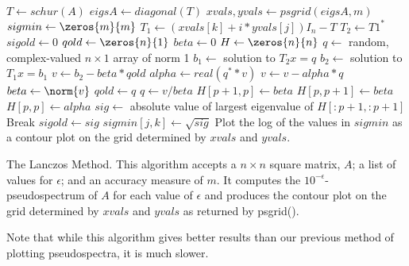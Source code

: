 \begin{algorithm}
\begin{algorithmic}[1]
	\State $T \gets schur(A)$			
	\State $eigsA \gets diagonal(T)$
	\State $xvals,yvals \gets psgrid(eigsA,m)$
	\State $sigmin \gets \zeros{m}{m}$					
		    \State $T_1 \gets (xvals[k]+i*yvals[j])I_n-T$  
		    \State {}
		    \State $T_2 \gets T1^*$        		
		    \State $sigold \gets 0$    
		    \State $qold \gets \zeros{n}{1}$
		    \State $beta \gets 0$
		    \State $H \gets \zeros{n}{n}$
		    \State $q \gets$ random, complex-valued $n \times 1$ array of norm 1 
		    \State {}
			    \State $b_1 \gets$ solution to $T_2x = q$	
			    \State $b_2 \gets$ solution to $T_1x = b_1$
			    \State $v \gets b_2 - beta*qold$
			    \State $alpha \gets real(q^**v)$
			    \State $v \gets v - alpha*q$
			    \State $beta \gets \norm{v}$
			    \State $qold \gets q$
			    \State $q \gets v/beta$
			    \State $H[p+1,p] \gets beta$
			    \State $H[p,p+1] \gets beta$
			    \State $H[p,p] \gets alpha$
			    \State $sig \gets$ absolute value of largest eigenvalue of $H[:p+1,:p+1]$
			        \State Break    
			    \EndIf
			    \State $sigold \gets sig$
			\EndFor
			\State $sigmin[j,k] \gets \sqrt{sig}$
	    \EndFor
	\EndFor
	\State Plot the log of the values in $sigmin$ as a contour plot on the grid determined by $xvals$ and $yvals$.
\EndProcedure
\end{algorithmic}
\caption{The Lanczos Method. This algorithm accepts a $n \times n$ square matrix, $A$; a list of values for $\epsilon$; and an accuracy measure of $m$. It computes the $10^{-\epsilon}$-pseudospectrum of $A$ for each value of $\epsilon$ and produces the contour plot on the grid determined by $xvals$ and $yvals$ as returned by psgrid().}
\label{alg:lanczos_method}
\end{algorithm}

Note that while this algorithm gives better results than our previous method of plotting pseudospectra, it is much slower.

